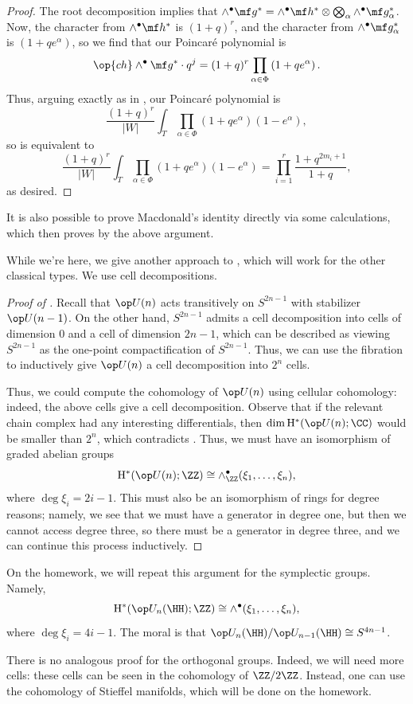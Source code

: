 \documentclass[../notes.tex]{subfiles}
\begin{document}
\begin{proof}
	The root decomposition implies that $\land^\bullet\mf g^*=\land^\bullet\mf h^*\otimes\bigotimes_\alpha\land^\bullet\mf g_\alpha^*$. Now, the character from $\land^\bullet\mf h^*$ is $(1+q)^r$, and the character from $\land^\bullet\mf g_\alpha^*$ is $(1+qe^\alpha)$, so we find that our Poincar\'e polynomial is
	\[\op{ch}\land^\bullet\mf g^*\cdot q^j=(1+q)^r\prod_{\alpha\in\Phi}\left(1+qe^\alpha\right).\]
	Thus, arguing exactly as in , our Poincar\'e polynomial is
	\[\frac{(1+q)^r}{\left|W\right|}\int_T\prod_{\alpha\in\Phi}(1+qe^\alpha)(1-e^\alpha),\]
	so  is equivalent to
	\[\frac{(1+q)^r}{\left|W\right|}\int_T\prod_{\alpha\in\Phi}(1+qe^\alpha)(1-e^\alpha)=\prod_{i=1}^r\frac{1+q^{2m_i+1}}{1+q},\]
	as desired.
\end{proof}
\begin{remark}
	It is also possible to prove Macdonald's identity directly via some calculations, which then proves  by the above argument.
\end{remark}
While we're here, we give another approach to , which will work for the other classical types. We use cell decompositions.
\begin{proof}[Proof of ]
	Recall that $\op U(n)$ acts transitively on $S^{2n-1}$ with stabilizer $\op U(n-1)$. On the other hand, $S^{2n-1}$ admits a cell decomposition into cells of dimension $0$ and a cell of dimension $2n-1$, which can be described as viewing $S^{2n-1}$ as the one-point compactification of $S^{2n-1}$. Thus, we can use the fibration to inductively give $\op U(n)$ a cell decomposition into $2^n$ cells.

	Thus, we could compute the cohomology of $\op U(n)$ using cellular cohomology: indeed, the above cells give a cell decomposition. Observe that if the relevant chain complex had any interesting differentials, then $\dim\mathrm H^*(\op U(n);\CC)$ would be smaller than $2^n$, which contradicts . Thus, we must have an isomorphism of graded abelian groups
	\[\mathrm H^*(\op U(n);\ZZ)\cong\land^\bullet_\ZZ(\xi_1,\ldots,\xi_n),\]
	where $\deg\xi_i=2i-1$. This must also be an isomorphism of rings for degree reasons; namely, we see that we must have a generator in degree one, but then we cannot access degree three, so there must be a generator in degree three, and we can continue this process inductively.
\end{proof}
\begin{remark}
	On the homework, we will repeat this argument for the symplectic groups. Namely,
	\[\mathrm H^*(\op U_n(\HH);\ZZ)\cong\land^\bullet(\xi_1,\ldots,\xi_n),\]
	where $\deg\xi_i=4i-1$. The moral is that $\op U_n(\HH)/\op U_{n-1}(\HH)\cong S^{4n-1}$.
\end{remark}
\begin{remark}
	There is no analogous proof for the orthogonal groups. Indeed, we will need more cells: these cells can be seen in the cohomology of $\ZZ/2\ZZ$. Instead, one can use the cohomology of Stieffel manifolds, which will be done on the homework.
\end{remark}
\end{document}
